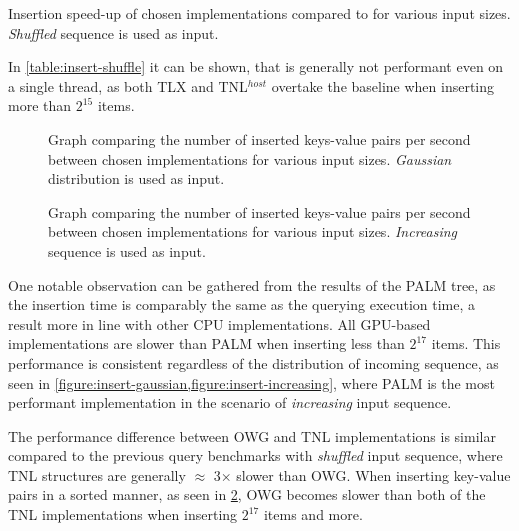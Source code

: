 \begin{table}
  \centering
  
  \caption{Insertion speed-up of chosen implementations compared to  for various input sizes. \textit{Shuffled} sequence is used as input.}
  \label{table:insert-shuffle}
\end{table}

In \cref{table:insert-shuffle} it can be shown, that  is generally not performant even on a single thread, as both TLX and TNL$^{host}$ overtake the baseline when inserting more than $2^{15}$ items.


\begin{figure}
  
  \caption{Graph comparing the number of inserted keys-value pairs per second between chosen implementations for various input sizes. \textit{Gaussian} distribution is used as input.}
  \label{figure:insert-gaussian}
\end{figure}

\begin{figure}
  
  \caption{Graph comparing the number of inserted keys-value pairs per second between chosen implementations for various input sizes. \textit{Increasing} sequence is used as input.}
  \label{figure:insert-increasing}
\end{figure}

One notable observation can be gathered from the results of the PALM tree, as the insertion time is comparably the same as the querying execution time, a result more in line with other CPU implementations. All GPU-based implementations are slower than PALM when inserting less than $2^{17}$ items. This performance is consistent regardless of the distribution of incoming sequence, as seen in \cref{figure:insert-gaussian,figure:insert-increasing}, where PALM is the most performant implementation in the scenario of \textit{increasing} input sequence.

The performance difference between OWG and TNL implementations is similar compared to the previous query benchmarks with \textit{shuffled} input sequence, where TNL structures are generally $\approx$ 3$\times$ slower than OWG. When inserting key-value pairs in a sorted manner, as seen in \cref{figure:insert-increasing}, OWG becomes slower than both of the TNL implementations when inserting $2^{{17}}$ items and more.
